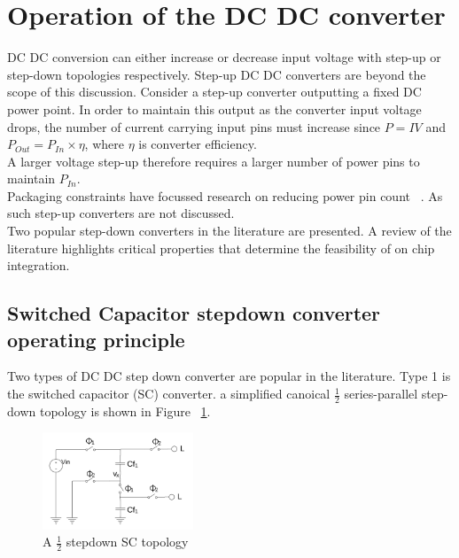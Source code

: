 \documentclass[letterpaper,twocolumn,10pt]{article}
\begin{document}

\section{Operation of the DC DC converter}

DC DC conversion can either increase or decrease input voltage with step-up or step-down topologies respectively. Step-up DC DC converters are beyond the scope of this discussion. Consider a step-up converter outputting a fixed DC power point. In order to maintain this output as the converter input voltage drops, the number of current carrying input pins must increase since $P = IV$ and $P_{Out} = P_{In}\times \eta$, where $\eta$ is converter efficiency.\\
A larger voltage step-up therefore requires a larger number of power pins to maintain $P_{In}$.\\ Packaging constraints have focussed research on reducing power pin count ~\cite{Marbell2011}. As such step-up converters are not discussed.\\
\indent Two popular step-down converters in the literature are presented. A review of the literature highlights critical properties that determine the feasibility of on chip integration.

\subsection{Switched Capacitor stepdown converter operating principle}\label{SCOpPrinciple}
Two types of DC DC step down converter are popular in the literature. Type 1 is the switched capacitor (SC) converter. a simplified canoical $\frac{1}{2}$ series-parallel step-down topology is shown in Figure ~\ref{SCTopology}.\\


\begin{figure}[here]
\includegraphics[width=0.4\textwidth]{SCTopology}
\caption{A $\frac{1}{2}$ stepdown SC topology}
\label{SCTopology}
\end{figure}
\end{document}
